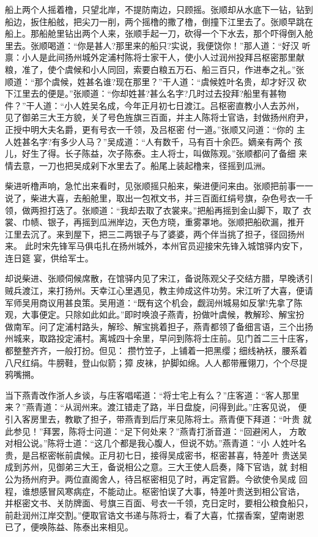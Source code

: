 船上两个人摇着橹，只望北岸，不提防南边，只顾摇。张顺却从水底下一钻，钻到
船边，扳住船舷，把尖刀一削，两个摇橹的撒了橹，倒撞下江里去了。张顺早跳在
船上。那船舱里钻出两个人来，张顺手起一刀，砍得一个下水去，那个吓得倒入舱
里去。张顺喝道：“你是甚人?那里来的船只?实说，我便饶你！”那人道：“好汉
听禀：小人是此间扬州城外定浦村陈将士家干人，使小人过润州投拜吕枢密那里献
粮，准了，使个虞候和小人同回，索要白粮五万石、船三百只，作进奉之礼。”张
顺道：“那个虞候，姓甚名谁?现在那里？”干人道：“虞候姓叶名贵，却才好汉
砍下江里去的便是。”张顺道：“你却姓甚?甚么名字?几时过去投拜?船里有甚物
件？”干人道：“小人姓吴名成，今年正月初七日渡江。吕枢密直教小人去苏州，
见了御弟三大王方貌，关了号色旌旗三百面，并主人陈将士官诰，封做扬州府尹，
正授中明大夫名爵，更有号衣一千领，及吕枢密付一道。”张顺又问道：“你的
主人姓甚名字?有多少人马？”吴成道：“人有数千，马有百十余匹。嫡亲有两个
孩儿，好生了得。长子陈益，次子陈泰。主人将士，叫做陈观。”张顺都问了备细
来情去意，一刀也把吴成剁下水里去了。船尾上装起橹来，径摇到瓜洲。

柴进听橹声响，急忙出来看时，见张顺摇只船来，柴进便问来由。张顺把前事一一
说了，柴进大喜，去船舱里，取出一包袱文书，并三百面红绢号旗，杂色号衣一千
领，做两担打迭了。张顺道：“我却去取了衣裳来。”把船再摇到金山脚下，取了
衣裳、巾帻、银子，再摇到瓜洲岸边，天色方晓，重雾罩地。张顺把船砍漏，推开
江里去沉了。来到屋下，把三二两银子与了婆婆，两个伴当挑了担子，径回扬州来。
此时宋先锋军马俱屯扎在扬州城外，本州官员迎接宋先锋入城馆驿内安下，连日筵
宴，供给军士。

却说柴进、张顺伺候席散，在馆驿内见了宋江，备说陈观父子交结方腊，早晚诱引
贼兵渡江，来打扬州。天幸江心里遇见，教主帅成这件功劳。宋江听了大喜，便请
军师吴用商议用甚良策。吴用道：“既有这个机会，觑润州城易如反掌!先拿了陈
观，大事便定。只除如此如此。”即时唤浪子燕青，扮做叶虞候，教解珍、解宝扮
做南军。问了定浦村路头，解珍、解宝挑着担子，燕青都领了备细言语，三个出扬
州城来，取路投定浦村。离城四十余里，早问到陈将士庄前。见门首二三十庄客，
都整整齐齐，一般打扮。但见：
攒竹笠子，上铺着一把黑缨；细线衲袄，腰系着八尺红绢。牛膀鞋，登山似箭；獐
皮袜，护脚如绵。人人都带雁翎刀，个个尽提鸦嘴搠。

当下燕青改作浙人乡谈，与庄客唱喏道：“将士宅上有么？”庄客道：“客人那里
来？”燕青道：“从润州来。渡江错走了路，半日盘旋，问得到此。”庄客见说，
便引入客房里去，教歇了担子，带燕青到后厅来见陈将士。燕青便下拜道：“叶贵
就此参见！”拜罢，陈将士问道：“足下何处来？”燕青打浙音道：“回避闲人，
方敢对相公说。”陈将士道：“这几个都是我心腹人，但说不妨。”燕青道：“小
人姓叶名贵，是吕枢密帐前虞候。正月初七日，接得吴成密书，枢密甚喜，特差叶
贵送吴成到苏州，见御弟三大王，备说相公之意。三大王使人启奏，降下官诰，就
封相公为扬州府尹。两位直阁舍人，待吕枢密相见了时，再定官爵。今欲使令吴成
回程，谁想感冒风寒病症，不能动止。枢密怕误了大事，特差叶贵送到相公官诰，
并枢密文书、关防牌面、号旗三百面、号衣一千领，克日定时，要相公粮食船只，
前赴润州江岸交割。”便取官诰文书递与陈将士，看了大喜，忙摆香案，望南谢恩
已了，便唤陈益、陈泰出来相见。


